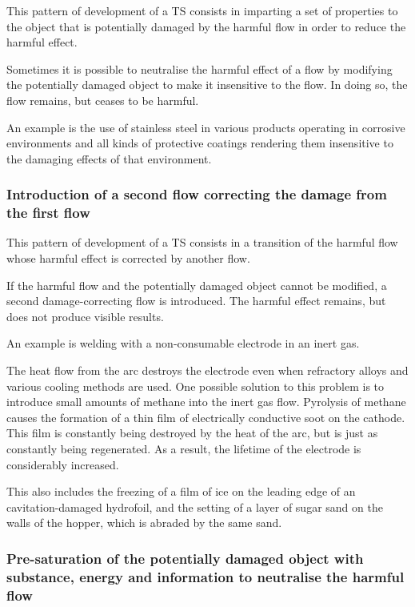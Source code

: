 \documentclass[a4paper,11pt]{article}
\begin{document}
This pattern of development of a TS consists in imparting a set of properties
to the object that is potentially damaged by the harmful flow in order to
reduce the harmful effect.

Sometimes it is possible to neutralise the harmful effect of a flow by
modifying the potentially damaged object to make it insensitive to the flow.
In doing so, the flow remains, but ceases to be harmful.

An example is the use of stainless steel in various products operating in
corrosive environments and all kinds of protective coatings rendering them
insensitive to the damaging effects of that environment.

\subsubsection{Introduction of a second flow correcting the damage from the
  first flow} 

This pattern of development of a TS consists in a transition of the harmful
flow whose harmful effect is corrected by another flow.

If the harmful flow and the potentially damaged object cannot be modified, a
second damage-correcting flow is introduced. The harmful effect remains, but
does not produce visible results.

An example is welding with a non-consumable electrode in an inert gas.

The heat flow from the arc destroys the electrode even when refractory alloys
and various cooling methods are used. One possible solution to this problem is
to introduce small amounts of methane into the inert gas flow. Pyrolysis of
methane causes the formation of a thin film of electrically conductive soot on
the cathode. This film is constantly being destroyed by the heat of the arc,
but is just as constantly being regenerated. As a result, the lifetime of the
electrode is considerably increased.

This also includes the freezing of a film of ice on the leading edge of an
cavitation-damaged hydrofoil, and the setting of a layer of sugar sand on the
walls of the hopper, which is abraded by the same sand.

\subsubsection{Pre-saturation of the potentially damaged object with
  substance, energy and information to neutralise  the harmful flow} 
\end{document}
